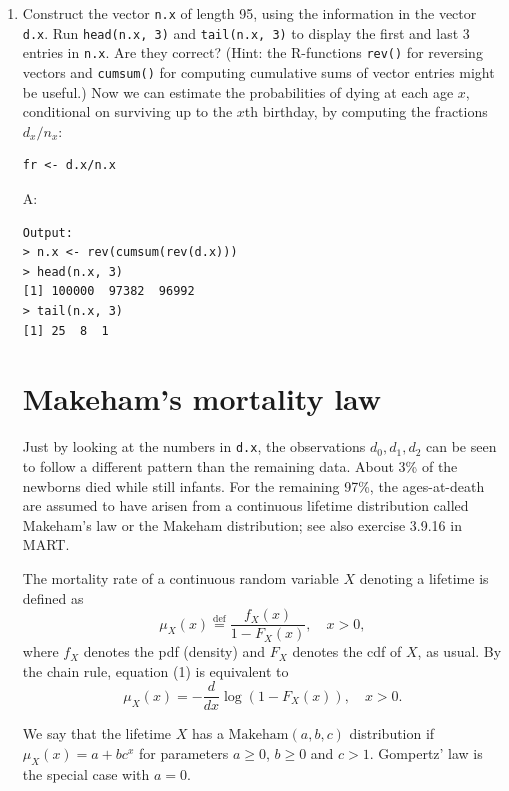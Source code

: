 \documentclass{article}
\begin{document}
\begin{enumerate}
\item[$\boldsymbol{Q_1}$] Construct the vector \texttt{n.x} of length 95, using the information in the vector \texttt{d.x}. Run \texttt{head(n.x, 3)} and \texttt{tail(n.x, 3)} to display the first and last 3 entries in \texttt{n.x}. Are they correct? (Hint: the R-functions \texttt{rev()} for reversing vectors and \texttt{cumsum()} for computing cumulative sums of vector entries might be useful.)
Now we can estimate the probabilities of dying at each age $x$, conditional on surviving up to the $x$th birthday, by computing the fractions $d_x/n_x$:
\begin{verbatim}
fr <- d.x/n.x
\end{verbatim}
A:
\begin{verbatim}
Output:
> n.x <- rev(cumsum(rev(d.x)))
> head(n.x, 3)
[1] 100000  97382  96992
> tail(n.x, 3)
[1] 25  8  1
\end{verbatim}
\newpage
\section{Makeham's mortality law}

Just by looking at the numbers in \texttt{d.x}, the observations $d_0, d_1, d_2$ can be seen to follow a different pattern than the remaining data. About 3\% of the newborns died while still infants. For the remaining 97\%, the ages-at-death are assumed to have arisen from a continuous lifetime distribution called Makeham's law or the Makeham distribution; see also exercise 3.9.16 in MART.

The mortality rate of a continuous random variable $X$ denoting a lifetime is defined as
\begin{equation}
\mu_X(x) \stackrel{\text{def}}{=} \frac{f_X(x)}{1 - F_X(x)}, \quad x > 0,
\end{equation}
where $f_X$ denotes the pdf (density) and $F_X$ denotes the cdf of $X$, as usual. By the chain rule, equation (1) is equivalent to
\begin{equation}
\mu_X(x) = -\frac{d}{dx} \log(1 - F_X(x)), \quad x > 0.
\end{equation}

We say that the lifetime $X$ has a $\text{Makeham}(a, b, c)$ distribution if $\mu_X(x) = a + bc^x$ for parameters $a \geq 0$, $b \geq 0$ and $c > 1$. Gompertz' law is the special case with $a = 0$.


\end{enumerate}
\end{document}
